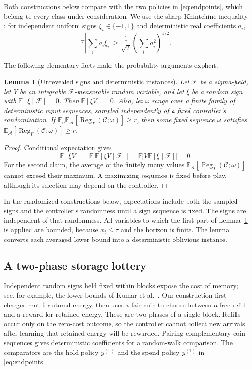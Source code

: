 \documentclass[11pt]{article}
\newtheorem{lemma}[theorem]{Lemma}
\newcommand{\E}{\mathbb E}
\newcommand{\Reg}{\operatorname{Reg}}
\begin{document}
Both constructions below compare with the two policies in
\eqref{eq:endpoints}, which belong to every class under consideration.
We use the sharp Khintchine inequality
\cite{haagerup1981khintchine}: for independent uniform signs
$\xi_i\in\{-1,1\}$ and deterministic real coefficients $a_i$,
\begin{equation}
\label{eq:khintchine}
\E\left|\sum_i a_i\xi_i\right|
\ge
\frac1{\sqrt2}\left(\sum_i a_i^2\right)^{1/2}.
\end{equation}

The following elementary facts make the probability arguments explicit.

\begin{lemma}[Unrevealed signs and deterministic instances]
\label{lem:averaging}
Let $\mathcal F$ be a sigma-field, let $V$ be an integrable
$\mathcal F$-measurable random variable, and let $\xi$ be a random
sign with $\E[\xi\mid\mathcal F]=0$. Then $\E[\xi V]=0$.
Also, let $\omega$ range over a finite family of deterministic
input sequences, sampled independently of a fixed controller's
randomization. If
$\E_\omega\E_{\mathcal A}[\Reg_T(\mathcal C;\omega)]\ge r$,
then some fixed sequence $\omega$ satisfies
$\E_{\mathcal A}[\Reg_T(\mathcal C;\omega)]\ge r$.
\end{lemma}

\begin{proof}
Conditional expectation gives
\[
\E[\xi V]
=\E\bigl[\E[\xi V\mid\mathcal F]\bigr]
=\E\bigl[V\E[\xi\mid\mathcal F]\bigr]=0.
\]
For the second claim, the average of the finitely many values
$\E_{\mathcal A}[\Reg_T(\mathcal C;\omega)]$ cannot exceed their
maximum. A maximizing sequence is fixed before play, although
its selection may depend on the controller.
\end{proof}

In the randomized constructions below, expectations include both
the sampled signs and the controller's randomness until a sign
sequence is fixed. The signs are independent of that randomness.
All variables to which the first part of Lemma~\ref{lem:averaging}
is applied are bounded, because $x_t\le\tau$ and the horizon is finite.
The lemma converts each averaged lower bound into a deterministic
oblivious instance.

\subsection{A two-phase storage lottery}

Independent random signs held fixed within blocks expose the
cost of memory; see, for example, the lower bounds of
Kumar et al.~\cite{kumar2023unbounded}.
Our construction first charges rent for stored energy, then uses a
fair coin to choose between a free refill and a reward for retained
energy. These are two phases of a single block. Refills occur only
on the zero-cost outcome, so the controller cannot collect new
arrivals after learning that retained energy will be rewarded.
Pairing complementary coin sequences gives deterministic coefficients
for a random-walk comparison. The comparators are the hold policy
$y^{(0)}$ and the spend policy $y^{(1)}$ in \eqref{eq:endpoints}.
\end{document}
